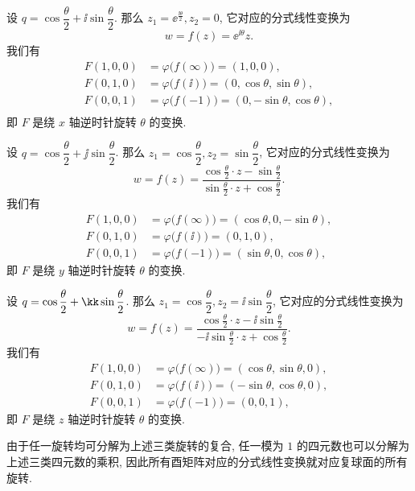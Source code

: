 \begin{exampleenum}
  \item 设 $q=\cos\dfrac\theta2+\ii\sin\dfrac\theta 2$.
  那么 $z_1=\ee^{\frac{\ii\theta}2}, z_2=0$, 它对应的分式线性变换为
  \[
    w=f(z)=\ee^{\ii\theta}z.
  \]
  我们有
  \begin{align*}
      F(1,0,0)&
    =\varphi\bigl(f(\infty)\bigr)
    =(1,0,0),\\
      F(0,1,0)&
    =\varphi\bigl(f(\ii)\bigr)
    =(0,\cos\theta,\sin\theta),\\
      F(0,0,1)&
    =\varphi\bigl(f(-1)\bigr)
    =(0,-\sin\theta,\cos\theta),\\
  \end{align*}
  即 $F$ 是绕 $x$ 轴逆时针旋转 $\theta$ 的变换.
  \item 设 $q=\cos\dfrac\theta2+\jj\sin\dfrac\theta 2$.
  那么 $z_1=\cos\dfrac\theta2, z_2=\sin\dfrac\theta2$, 它对应的分式线性变换为
  \[
    w=f(z)=\frac{\cos \frac\theta2 \cdot z-\sin\frac\theta2}{\sin\frac\theta2 \cdot z+\cos\frac\theta2}.
  \]
  我们有
  \begin{align*}
      F(1,0,0)&
    =\varphi\bigl(f(\infty)\bigr)
    =(\cos\theta,0,-\sin\theta),\\
      F(0,1,0)&
    =\varphi\bigl(f(\ii)\bigr)
    =(0,1,0),\\
      F(0,0,1)&
    =\varphi\bigl(f(-1)\bigr)
    =(\sin\theta,0,\cos\theta),
  \end{align*}
  即 $F$ 是绕 $y$ 轴逆时针旋转 $\theta$ 的变换.
  \item 设 $q=\cos\dfrac\theta2+\kk\sin\dfrac\theta 2$.
  那么 $z_1=\cos\dfrac\theta2, z_2=\ii\sin\dfrac\theta2$, 它对应的分式线性变换为
  \[
    w=f(z)=\frac{\cos \frac\theta2 \cdot z-\ii \sin\frac\theta2}{-\ii\sin\frac\theta2 \cdot z+\cos\frac\theta2}.
  \]
  我们有
  \begin{align*}
      F(1,0,0)&
    =\varphi\bigl(f(\infty)\bigr)
    =(\cos\theta,\sin\theta,0),\\
      F(0,1,0)&
    =\varphi\bigl(f(\ii)\bigr)
    =(-\sin\theta,\cos\theta,0),\\
      F(0,0,1)&
    =\varphi\bigl(f(-1)\bigr)
    =(0,0,1),
  \end{align*}
  即 $F$ 是绕 $z$ 轴逆时针旋转 $\theta$ 的变换.
  
  由于任一旋转均可分解为上述三类旋转的复合, 任一模为 $1$ 的四元数也可以分解为上述三类四元数的乘积, 因此所有酉矩阵对应的分式线性变换就对应复球面的所有旋转.
\end{exampleenum}

